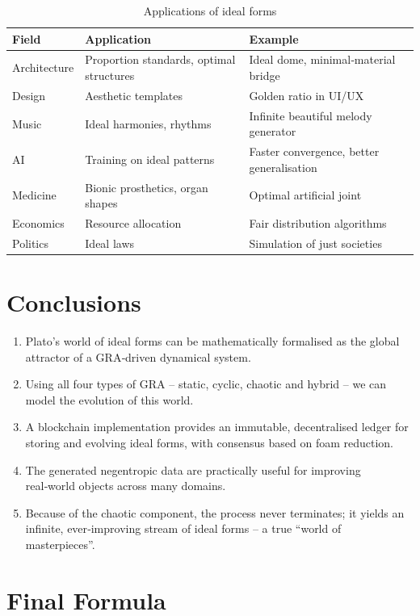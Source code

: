 \documentclass[12pt,a4paper]{article}
\begin{document}
\begin{table}[h]
\centering
\caption{Applications of ideal forms}
\label{tab:applications}
\begin{tabular}{|p{3cm}|p{6cm}|p{4cm}|}
\hline
Field & Application & Example \\
\hline
Architecture & Proportion standards, optimal structures & Ideal dome, minimal‑material bridge \\
Design & Aesthetic templates & Golden ratio in UI/UX \\
Music & Ideal harmonies, rhythms & Infinite beautiful melody generator \\
AI & Training on ideal patterns & Faster convergence, better generalisation \\
Medicine & Bionic prosthetics, organ shapes & Optimal artificial joint \\
Economics & Resource allocation & Fair distribution algorithms \\
Politics & Ideal laws & Simulation of just societies \\
\hline
\end{tabular}
\end{table}

\section{Conclusions}

\begin{enumerate}
    \item Plato’s world of ideal forms can be mathematically formalised as the global attractor of a GRA‑driven dynamical system.
    \item Using all four types of GRA – static, cyclic, chaotic and hybrid – we can model the evolution of this world.
    \item A blockchain implementation provides an immutable, decentralised ledger for storing and evolving ideal forms, with consensus based on foam reduction.
    \item The generated negentropic data are practically useful for improving real‑world objects across many domains.
    \item Because of the chaotic component, the process never terminates; it yields an infinite, ever‑improving stream of ideal forms – a true “world of masterpieces”.
\end{enumerate}

\section*{Final Formula}
\end{document}

